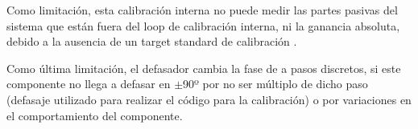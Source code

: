 Como limitación, esta calibración interna no puede medir las partes pasivas del sistema que están fuera del loop de 
calibración interna, ni la ganancia absoluta, debido a la ausencia de un target standard de calibración \cite{Wang2010}.

Como última limitación, el defasador cambia la fase de a pasos discretos, si este componente no llega a defasar en $\pm$90º
por no ser múltiplo de dicho paso (defasaje utilizado para realizar el código para la calibración) o por variaciones en el 
comportamiento del componente.


